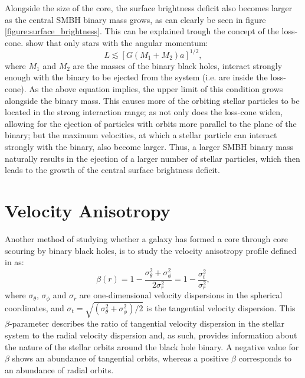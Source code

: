 \documentclass[english, oneside]{HYgradu}
\begin{document}
Alongside the size of the core, the surface brightness deficit also becomes larger as the central SMBH binary mass grows, as can clearly be seen in figure \ref{figure:surface_brightness}. This can be explained trough the concept of the loss-cone. \cite{BinneyTremaine} show that only stars with the angular momentum:
\begin{equation}
L \lesssim [G(M_1 + M_2)a]^{1/2}, \label{eq:loss-cone}
\end{equation}
where $M_1$ and $M_2$ are the masses of the binary black holes, interact strongly enough with the binary to be ejected from the system (i.e. are inside the loss-cone). As the above equation implies, the upper limit of this condition grows alongside the binary mass. This causes more of the orbiting stellar particles to be located in the strong interaction range; as not only does the loss-cone widen, allowing for the ejection of particles with orbits more parallel to the plane of the binary; but the maximum velocities, at which a stellar particle can interact strongly with the binary, also become larger. Thus, a larger SMBH binary mass naturally results in the ejection of a larger number of stellar particles, which then leads to the growth of the central surface brightness deficit.  

\section{Velocity Anisotropy}


Another method of studying whether a galaxy has formed a core through core scouring by binary black holes, is to study the velocity anisotropy profile defined in \cite{BinneyTremaine} as:
\begin{equation}
\beta(r) = 1 - \frac{\sigma_\theta^2 + \sigma_\phi^2}{2\sigma_r^2} = 1 - \frac{\sigma_t^2}{\sigma_r^2}, \label{eq:beta}
\end{equation}
where $\sigma_\theta$, $\sigma_\phi$ and $\sigma_r$ are one-dimensional velocity dispersions in the spherical coordinates, and $\sigma_t = \sqrt{(\sigma_\theta^2 + \sigma_\phi^2) / 2}$ is the tangential velocity dispersion. This $\beta$-parameter describes the ratio of tangential velocity dispersion in the stellar system to the radial velocity dispersion and, as such, provides information about the nature of the stellar orbits around the black hole binary. A negative value for $\beta$ shows an abundance of tangential orbits, whereas a positive $\beta$ corresponds to an abundance of radial orbits. 
\end{document}
